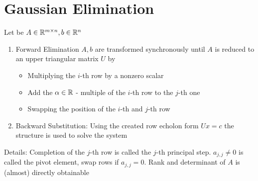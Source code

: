 \section{Gaussian Elimination}

\begin{definition}[Algorithm]
	Let be $A \in \mathbb{R}^{m \times n}, b \in \mathbb{R}^n$ 
	\begin{enumerate} [noitemsep]
		\item Forward Elimination $A, b$ are transformed synchronously until $A$ is reduced to an upper triangular matrix $U$ by \begin{itemize}[noitemsep]
			\item Multiplying the $i$-th row by a nonzero scalar
			\item Add the $\alpha \in \mathbb{R}$ - multiple of the $i$-th row to the $j$-th one
			\item Swapping the position of the $i$-th and $j$-th row
		\end{itemize}
		\item Backward Substitution: Using the created row echolon form $Ux = c$ the structure is used to solve the system
	\end{enumerate}
	Details: Completion of the $j$-th row is called the $j$-th principal step. $a_{j,j} \neq 0$ is called the pivot element, swap rows if $a_{j,j} = 0$. Rank and determinant of $A$ is (almost) directly obtainable
\end{definition}

